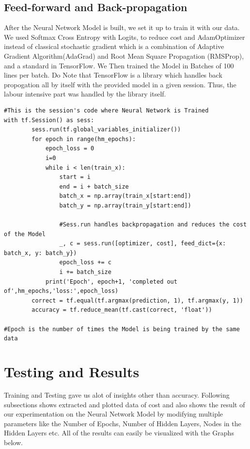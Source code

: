 \subsection{Feed-forward and Back-propagation}
After the Neural Network Model is built, we set it up to train it with our data. We used Softmax Cross Entropy with Logits, to reduce cost and AdamOptimizer instead of classical stochastic gradient which is a combination of Adaptive Gradient Algorithm(AdaGrad) and Root Mean Square Propagation (RMSProp), and a standard in TensorFlow. We Then trained the Model in Batches of 100 lines per batch. Do Note that TensorFlow is a library which handles back propogation all by itself with the provided model in a given session. Thus, the labour intensive part was handled by the library itself.

\begin{verbatim}
#This is the session's code where Neural Network is Trained
with tf.Session() as sess:
        sess.run(tf.global_variables_initializer())
        for epoch in range(hm_epochs):
            epoch_loss = 0
            i=0
            while i < len(train_x):
                start = i
                end = i + batch_size
                batch_x = np.array(train_x[start:end])
                batch_y = np.array(train_y[start:end])
                
                #Sess.run handles backpropagation and reduces the cost of the Model
                _, c = sess.run([optimizer, cost], feed_dict={x: batch_x, y: batch_y})
                epoch_loss += c
                i += batch_size
            print('Epoch', epoch+1, 'completed out of',hm_epochs,'loss:',epoch_loss)
        correct = tf.equal(tf.argmax(prediction, 1), tf.argmax(y, 1))
        accuracy = tf.reduce_mean(tf.cast(correct, 'float'))

#Epoch is the number of times the Model is being trained by the same data
\end{verbatim}

\section{Testing and Results}
Training and Testing gave us alot of insights other than accuracy. Following subsections shows extracted and plotted data of cost and also shows the result of our experimentation on the Neural Network Model by modifying multiple parameters like the Number of Epochs, Number of Hidden Layers, Nodes in the Hidden Layers etc. All of the results can easily be visualized with the Graphs below.


